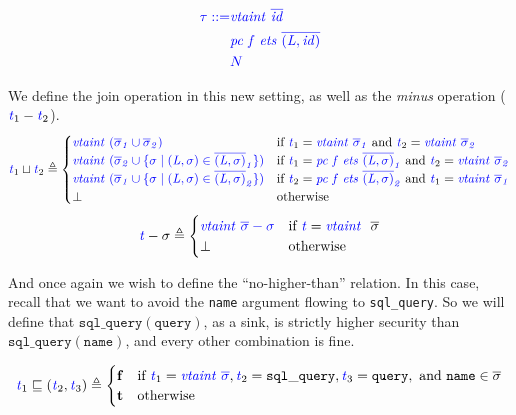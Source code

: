 \documentclass{llncs}
\begin{document}
\[  \color{blue}
\begin{aligned}
  \tau ::= & \mathit{\color{blue} vtaint ~ \overline{id}} \\
  & \mathit{\color{blue} pc ~ f ~ ets ~ \overline{(L,id)}} \\
  & {\color{blue} N} \\
\end{aligned}\]

We define the join operation in this new setting, as well as the {\em minus} operation (\(\mathit{\color{blue} t}_1 - \mathit{\color{blue} t}_2\)).
%
\[\mathit{\color{blue} t}_1 \sqcup \mathit{\color{blue} t}_2 \triangleq
\begin{cases}
  \mathit{\color{blue} vtaint ~ (\overline{\sigma}_1 \cup \overline{\sigma}_2)} &
  \textnormal{if } \mathit{\color{blue} t}_1 = \mathit{\color{blue} vtaint ~ \overline{\sigma}_1} \textnormal{ and }
  \mathit{\color{blue} t}_2 = \mathit{\color{blue} vtaint ~ \overline{\sigma}_2}\\
  \mathit{\color{blue} vtaint ~ (\overline{\sigma}_2 \cup \{\sigma \mid (L,\sigma) \in \overline{(L,\sigma)}_1\})} &
  \textnormal{if } \mathit{\color{blue} t}_1 = \mathit{\color{blue} pc ~ f ~ ets ~ \overline{(L,\sigma)}_1} \textnormal{ and }
  \mathit{\color{blue} t}_2 = \mathit{\color{blue} vtaint ~ \overline{\sigma}_2}\\
  \mathit{\color{blue} vtaint ~ (\overline{\sigma}_1 \cup \{\sigma \mid (L,\sigma) \in \overline{(L,\sigma)}_2\})} &
  \textnormal{if } \mathit{\color{blue} t}_2 = \mathit{\color{blue} pc ~ f ~ ets ~ \overline{(L,\sigma)}_2} \textnormal{ and }
  \mathit{\color{blue} t}_1 = \mathit{\color{blue} vtaint ~ \overline{\sigma}_1}\\
  \bot & \textnormal{otherwise} \\
\end{cases}\]
%
\[\mathit{\color{blue} t} - \sigma \triangleq
\begin{cases}
  \mathit{\color{blue} vtaint ~ \overline{\sigma} - \sigma} &
  \textnormal{if } \mathit{\color{blue} t} = \mathit{\color{blue} vtaint ~ ~} \overline{\sigma} \\
  \bot & \textnormal{otherwise} \\
\end{cases}\]

And once again we wish to define the ``no-higher-than'' relation. In this case,
recall that we want to avoid the {\tt name} argument flowing to {\tt sql\_query}.
So we will define that \(\mathtt{sql\_query(query)}\), as a sink, is strictly
higher security than \(\mathtt{sql\_query(name)}\), and every other combination is fine.

\[\mathit{\color{blue} t}_1 \sqsubseteq (\mathit{\color{blue} t}_2,\mathit{\color{blue} t}_3) \triangleq
\begin{cases}
  \mathbf{f} & \textnormal{if } \mathit{\color{blue} t}_1 = \mathit{\color{blue} vtaint ~ \overline{\sigma}},
  \mathit{\color{blue} t}_2 = \mathtt{sql\_query}, \mathit{\color{blue} t}_3 = \mathtt{query}, \textnormal{ and }
  \mathtt{name} \in \overline{\sigma} \\
  \mathbf{t} & \textnormal{otherwise} \\
\end{cases}\]
\end{document}
